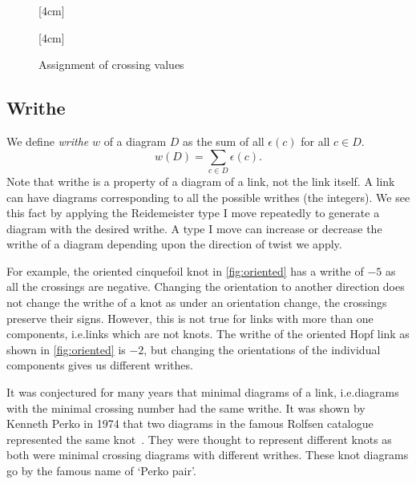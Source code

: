 \begin{figure}
    \centering
    [4cm]{
        }\quad
    [4cm]{
        }
    \caption{Assignment of crossing values}
    \label{fig:crossings}
\end{figure}

\subsection{Writhe}

We define \textit{writhe} \(w\) of a diagram \(D\) as the sum of all \(\epsilon(c)\) for all \(c \in D\). \[w(D) = \sum_{c\in D} \epsilon(c).\] Note that writhe is a property of a diagram of a link, not the link itself. A link can have diagrams corresponding to all the possible writhes (the integers). We see this fact by applying the Reidemeister type I move repeatedly to generate a diagram with the desired writhe. A type I move can increase or decrease the writhe of a diagram depending upon the direction of twist we apply.

For example, the oriented cinquefoil knot in \cref{fig:oriented} has a writhe of \(-5\) as all the crossings are negative. Changing the orientation to another direction does not change the writhe of a knot as under an orientation change, the crossings preserve their signs. However, this is not true for links with more than one components, i.e.\@ links which are not knots. The writhe of the oriented Hopf link as shown in \cref{fig:oriented} is \(-2\), but changing the orientations of the individual components gives us different writhes.

It was conjectured for many years that minimal diagrams of a link, i.e.\@ diagrams with the minimal crossing number had the same writhe. It was shown by Kenneth Perko in 1974 that two diagrams in the famous Rolfsen catalogue represented the same knot~\cite{perko}. They were thought to represent different knots as both were minimal crossing diagrams with different writhes. These knot diagrams go by the famous name of `Perko pair'.

